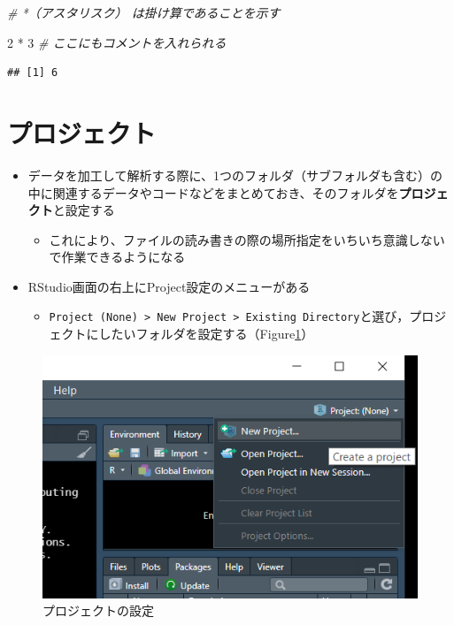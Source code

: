 \documentclass[
  xelatex,ja=standard, b5paper]{bxjsbook}
\newenvironment{Shaded}{\begin{snugshade}}{\end{snugshade}}
\newcommand{\CommentTok}[1]{\textcolor[rgb]{0.56,0.35,0.01}{\textit{#1}}}
\newcommand{\DecValTok}[1]{\textcolor[rgb]{0.00,0.00,0.81}{#1}}
\newcommand{\SpecialCharTok}[1]{\textcolor[rgb]{0.00,0.00,0.00}{#1}}
\providecommand{\tightlist}{%
  \setlength{\itemsep}{0pt}\setlength{\parskip}{0pt}}
\begin{document}
\begin{Shaded}
\begin{Highlighting}[]
\CommentTok{\# *（アスタリスク） は掛け算であることを示す}

\DecValTok{2} \SpecialCharTok{*} \DecValTok{3}  \CommentTok{\# ここにもコメントを入れられる}
\end{Highlighting}
\end{Shaded}

\begin{verbatim}
## [1] 6
\end{verbatim}

\hypertarget{p-project}{%
\section{プロジェクト}\label{p-project}}

\begin{itemize}
\tightlist
\item
  データを加工して解析する際に、1つのフォルダ（サブフォルダも含む）の中に関連するデータやコードなどをまとめておき、そのフォルダを\textbf{プロジェクト}と設定する

  \begin{itemize}
  \tightlist
  \item
    これにより、ファイルの読み書きの際の場所指定をいちいち意識しないで作業できるようになる
  \end{itemize}
\item
  RStudio画面の右上にProject設定のメニューがある

  \begin{itemize}
  \tightlist
  \item
    \texttt{Project\ (None)\ \textgreater{}\ New\ Project\ \textgreater{}\ Existing\ Directory}と選び，プロジェクトにしたいフォルダを設定する（Figure\ref{fig:project}）
  \end{itemize}
\end{itemize}

\begin{figure}

{\centering \includegraphics[width=7.11in]{images/project} 

}

\caption{プロジェクトの設定}\label{fig:project}
\end{figure}
\end{document}
